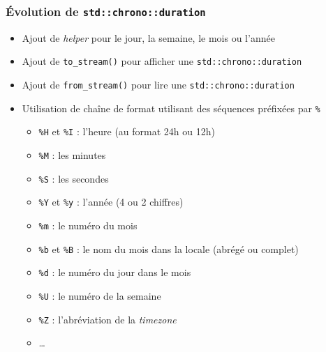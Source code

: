\documentclass[C++.tex]{subfiles}
\begin{document}
\begin{frame}[fragile]
	\frametitle{Évolution de \lstinline|std::chrono::duration|}
	\begin{itemize}
		\item Ajout de \textit{helper} pour le jour, la semaine, le mois ou l'année
		\item Ajout de \lstinline|to_stream()| pour afficher une \lstinline|std::chrono::duration|
		\item Ajout de \lstinline|from_stream()| pour lire une \lstinline|std::chrono::duration|
		\item Utilisation de chaîne de format utilisant des séquences préfixées par \lstinline|%|
		\begin{itemize}
			\item \lstinline|%H| et \lstinline|%I| : l'heure (au format 24h ou 12h)
			\item \lstinline|%M| : les minutes
			\item \lstinline|%S| : les secondes
			\item \lstinline|%Y| et \lstinline|%y| : l'année (4 ou 2 chiffres)
			\item \lstinline|%m| : le numéro du mois
			\item \lstinline|%b| et \lstinline|%B| :  le nom du mois dans la locale (abrégé ou complet)
			\item \lstinline|%d| : le numéro du jour dans le mois
			\item \lstinline|%U| : le numéro de la semaine
			\item \lstinline|%Z| : l'abréviation de la \textit{timezone}
			\item \ldots


		\end{itemize}
	\end{itemize}
\end{frame}
\end{document}
